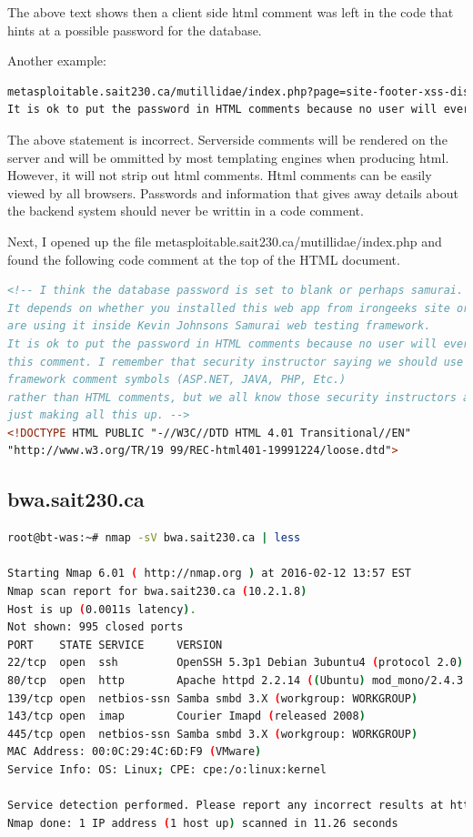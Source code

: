 \documentclass{article}
\begin{document}
The above text shows then a client side html comment was left in the code that hints at a possible password for the database.

Another example:

\begin{lstlisting}[language=Bash]
metasploitable.sait230.ca/mutillidae/index.php?page=site-footer-xss-discussion.php:5: \
It is ok to put the password in HTML comments because no user will ever see 
\end{lstlisting}

The above statement is incorrect. Serverside comments will be rendered on the server
and will be ommitted by most templating engines when producing html. However, it will
not strip out html comments. Html comments can be easily viewed by all browsers. Passwords
and information that gives away details about the backend system should never be
writtin in a code comment.

Next, I opened up the file metasploitable.sait230.ca/mutillidae/index.php and 
found the following code comment at the top of the HTML document.

\begin{lstlisting}[language=HTML]
<!-- I think the database password is set to blank or perhaps samurai.
It depends on whether you installed this web app from irongeeks site or
are using it inside Kevin Johnsons Samurai web testing framework. 
It is ok to put the password in HTML comments because no user will ever see 
this comment. I remember that security instructor saying we should use the
framework comment symbols (ASP.NET, JAVA, PHP, Etc.) 
rather than HTML comments, but we all know those security instructors are 
just making all this up. -->
<!DOCTYPE HTML PUBLIC "-//W3C//DTD HTML 4.01 Transitional//EN" 
"http://www.w3.org/TR/19 99/REC-html401-19991224/loose.dtd">
\end{lstlisting}

\subsection{bwa.sait230.ca}

\begin{lstlisting}[language=bash]
root@bt-was:~# nmap -sV bwa.sait230.ca | less

Starting Nmap 6.01 ( http://nmap.org ) at 2016-02-12 13:57 EST
Nmap scan report for bwa.sait230.ca (10.2.1.8)
Host is up (0.0011s latency).
Not shown: 995 closed ports
PORT    STATE SERVICE     VERSION
22/tcp  open  ssh         OpenSSH 5.3p1 Debian 3ubuntu4 (protocol 2.0)
80/tcp  open  http        Apache httpd 2.2.14 ((Ubuntu) mod_mono/2.4.3 PHP/5.3.2-1ubuntu4.5 with Suhosin-Patch mod_python/3.3.1 Python/2.6.5 mod_perl/2.0.4 Perl/v5.10.1)
139/tcp open  netbios-ssn Samba smbd 3.X (workgroup: WORKGROUP)
143/tcp open  imap        Courier Imapd (released 2008)
445/tcp open  netbios-ssn Samba smbd 3.X (workgroup: WORKGROUP)
MAC Address: 00:0C:29:4C:6D:F9 (VMware)
Service Info: OS: Linux; CPE: cpe:/o:linux:kernel

Service detection performed. Please report any incorrect results at http://nmap.org/submit/ .
Nmap done: 1 IP address (1 host up) scanned in 11.26 seconds
\end{lstlisting}
\end{document}
